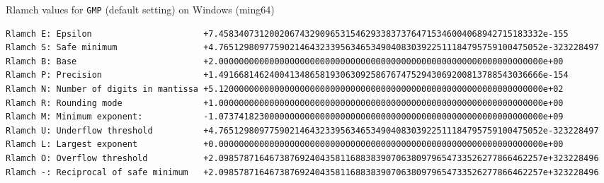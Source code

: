 \documentclass[12pt]{article}
\begin{document}
\begin{table}
\caption{Rlamch values for {\tt GMP} (default setting) on Windows (ming64) }\label{rlamchgmp}
\begin{center}
\scriptsize
{
\begin{verbatim}
Rlamch E: Epsilon                      +7.4583407312002067432909653154629338373764715346004068942715183332e-155
Rlamch S: Safe minimum                 +4.7651298097759021464323395634653490408303922511184795759100475052e-323228497
Rlamch B: Base                         +2.0000000000000000000000000000000000000000000000000000000000000000e+00
Rlamch P: Precision                    +1.4916681462400413486581930630925867674752943069200813788543036666e-154
Rlamch N: Number of digits in mantissa +5.1200000000000000000000000000000000000000000000000000000000000000e+02
Rlamch R: Rounding mode                +1.0000000000000000000000000000000000000000000000000000000000000000e+00
Rlamch M: Minimum exponent:            -1.0737418230000000000000000000000000000000000000000000000000000000e+09
Rlamch U: Underflow threshold          +4.7651298097759021464323395634653490408303922511184795759100475052e-323228497
Rlamch L: Largest exponent             +0.0000000000000000000000000000000000000000000000000000000000000000e+00
Rlamch O: Overflow threshold           +2.0985787164673876924043581168838390706380979654733526277866462257e+323228496
Rlamch -: Reciprocal of safe minimum   +2.0985787164673876924043581168838390706380979654733526277866462257e+323228496
\end{verbatim}
}
\end{center}
\end{table}
\end{document}
